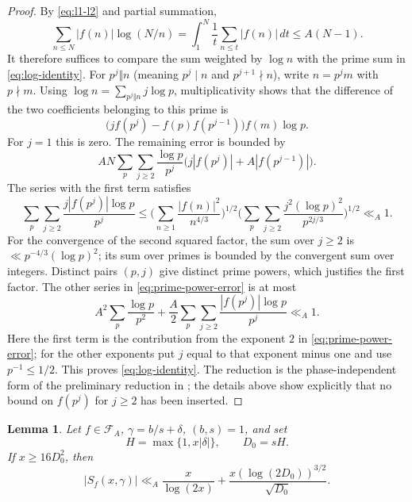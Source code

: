 \documentclass[11pt]{amsart}
\numberwithin{equation}{section}
\numberwithin{figure}{section}
\newtheorem{lemma}{Lemma}[section]
\theoremstyle{definition}
\newcommand{\FA}{\mathcal F_A}
\begin{document}
\begin{proof}
By \eqref{eq:l1-l2} and partial summation,
\[
 \sum_{n\le N}|f(n)|\log(N/n)
 =\int_1^N\frac1t\sum_{n\le t}|f(n)|\,dt
 \le A(N-1).
\]
It therefore suffices to compare the sum weighted by $\log n$ with the
prime sum in \eqref{eq:log-identity}.
For $p^j\Vert n$ (meaning $p^j\mid n$ and $p^{j+1}\nmid n$),
write $n=p^jm$ with $p\nmid m$.
Using $\log n=\sum_{p^j\Vert n}j\log p$, multiplicativity shows that the
difference of the two coefficients belonging to this prime is
\[
 \bigl(jf(p^j)-f(p)f(p^{j-1})\bigr)f(m)\log p.
\]
For $j=1$ this is zero. The remaining error is bounded by
\begin{equation}\label{eq:prime-power-error}
 AN\sum_p\sum_{j\ge2}\frac{\log p}{p^j}
       \bigl(j|f(p^j)|+A|f(p^{j-1})|\bigr).
\end{equation}
The series with the first term satisfies
\[
 \sum_p\sum_{j\ge2}\frac{j|f(p^j)|\log p}{p^j}
 \le
 \bigg(\sum_{n\ge1}\frac{|f(n)|^2}{n^{4/3}}\bigg)^{1/2}
 \bigg(\sum_p\sum_{j\ge2}
       \frac{j^2(\log p)^2}{p^{2j/3}}\bigg)^{1/2}\ll_A1.
\]
For the convergence of the second squared factor, the sum over $j\ge2$
is $\ll p^{-4/3}(\log p)^2$; its sum over primes is bounded by the
convergent sum over integers. Distinct pairs $(p,j)$ give distinct prime
powers, which justifies the first factor.
The other series in \eqref{eq:prime-power-error} is at most
\[
 A^2\sum_p\frac{\log p}{p^2}
 +\frac A2\sum_p\sum_{j\ge2}
             \frac{|f(p^j)|\log p}{p^j}\ll_A1.
\]
Here the first term is the contribution from the exponent $2$ in
\eqref{eq:prime-power-error}; for the other exponents put $j$ equal to
that exponent minus one and use $p^{-1}\le1/2$.
This proves \eqref{eq:log-identity}. The reduction is the
phase-independent form of the preliminary reduction in \cite[Section~2]{MV};
the details above show explicitly that no bound on $f(p^j)$ for $j\ge2$
has been inserted.
\end{proof}

\begin{lemma}\label{lem:coarse}
Let $f\in\FA$, $\gamma=b/s+\delta$, $(b,s)=1$, and set
\[
 H=\max\{1,x|\delta|\},\qquad D_0=sH.
\]
If $x\ge16D_0^2$, then
\begin{equation}\label{eq:coarse}
 |S_f(x,\gamma)|\ll_A
 \frac{x}{\log(2x)}+
 \frac{x(\log(2D_0))^{3/2}}{\sqrt{D_0}}.
\end{equation}
\end{lemma}
\end{document}
